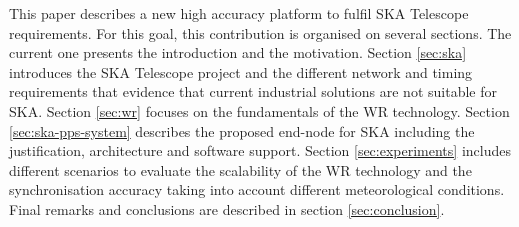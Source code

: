This paper describes a new high accuracy platform to fulfil SKA Telescope requirements. For this goal, this contribution is organised on several sections. The current one presents the introduction and the motivation. Section \ref{sec:ska} introduces the SKA Telescope project and the different network and timing requirements that evidence that current industrial solutions are not suitable for SKA. Section \ref{sec:wr} focuses on the fundamentals of the WR technology. Section \ref{sec:ska-pps-system} describes the proposed end-node for SKA including the justification, architecture and software support. Section \ref{sec:experiments} includes different scenarios to evaluate the scalability of the WR technology and the synchronisation accuracy taking into account different meteorological conditions. Final remarks and conclusions are described in section \ref{sec:conclusion}. 
